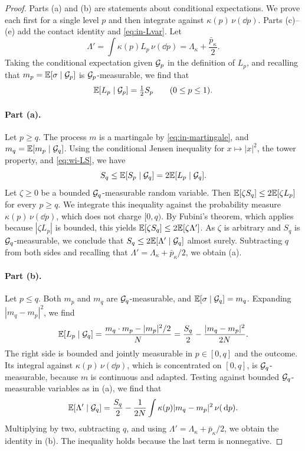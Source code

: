 \begin{proof}
Parts (a) and (b) are statements about conditional expectations. We
prove each first for a single level $p$ and then integrate against
$\kappa(p)\,\nu(\dd p)$. Parts (c)--(e) add the contact identity and
\eqref{eq:in-Lvar}. Let
\[
 \Lambda'=\int\kappa(p)L_p\,\nu(\dd p)=\Lambda_\kappa+\frac{\bar p_\kappa}2 .
\]
Taking the conditional expectation given $\mathcal G_p$ in the definition of
$L_p$, and recalling that $m_p=\mathbb E[\sigma\mid\mathcal G_p]$ is
$\mathcal G_p$-measurable, we find that
\begin{equation}\label{eq:wi-LS}
 \mathbb E[L_p\mid\mathcal G_p]=\tfrac12S_p\qquad(0\le p\le1).
\end{equation}

\paragraph{Part (a).}
Let $p\ge q$. The process $m$ is a martingale by
\eqref{eq:in-martingale}, and $m_q=\mathbb E[m_p\mid\mathcal G_q]$. Using the conditional Jensen
inequality for $x\mapsto|x|^2$, the tower property, and \eqref{eq:wi-LS},
we have
\[
 S_q\le\mathbb E[S_p\mid\mathcal G_q]=2\mathbb E[L_p\mid\mathcal G_q].
\]
Let $\zeta\ge0$ be a bounded $\mathcal G_q$-measurable random variable. Then
$\mathbb E[\zeta S_q]\le2\mathbb E[\zeta L_p]$ for every $p\ge q$. We integrate this inequality against the probability measure
$\kappa(p)\,\nu(\dd p)$, which does not charge
$[0,q)$. By Fubini's theorem,
which applies because $|\zeta L_p|$ is bounded, this yields
$\mathbb E[\zeta S_q]\le2\mathbb E[\zeta\Lambda']$. As $\zeta$ is arbitrary and $S_q$
is $\mathcal G_q$-measurable, we conclude that
$S_q\le2\mathbb E[\Lambda'\mid\mathcal G_q]$ almost surely. Subtracting $q$ from
both sides and recalling that $\Lambda'=\Lambda_\kappa+\bar p_\kappa/2$,
we obtain (a).

\paragraph{Part (b).}
Let $p\le q$. Both $m_p$ and $m_q$ are $\mathcal G_q$-measurable, and
$\mathbb E[\sigma\mid\mathcal G_q]=m_q$. Expanding $|m_q-m_p|^2$, we find
\[
 \mathbb E[L_p\mid\mathcal G_q]=\frac{m_q\cdot m_p-|m_p|^2/2}N
 =\frac{S_q}2-\frac{|m_q-m_p|^2}{2N}.
\]
The right side is bounded and jointly measurable in $p\in[0,q]$ and the
outcome. Its integral against $\kappa(p)\,\nu(\dd p)$, which is
concentrated on $[0,q]$, is $\mathcal G_q$-measurable, because $m$ is
continuous and adapted. Testing against bounded $\mathcal G_q$-measurable
variables as in (a), we find that
\[
 \mathbb E[\Lambda'\mid\mathcal G_q]
 =\frac{S_q}2-\frac1{2N}\int\kappa(p)|m_q-m_p|^2\,\nu(\,\mathrm d p).
\]
Multiplying by two, subtracting $q$, and using
$\Lambda'=\Lambda_\kappa+\bar p_\kappa/2$, we obtain the identity in
(b). The inequality holds because the last term is nonnegative.


\end{proof}
